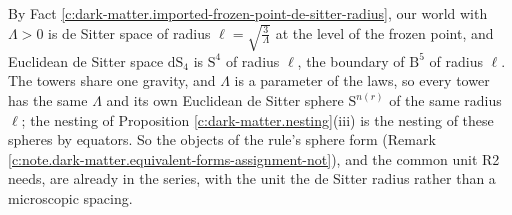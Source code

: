 \documentclass[11pt]{article}
\theoremstyle{definition}
\theoremstyle{plain}
\providecommand{\B}{}\renewcommand{\B}{\mathrm{B}}
\providecommand{\Sph}{}\renewcommand{\Sph}{\mathrm{S}}
\providecommand{\dS}{}\renewcommand{\dS}{\mathrm{dS}}
\begin{document}
\label{c:note.dark-matter.setting-what-could-fix-unit-de-2}
By Fact \ref{c:dark-matter.imported-frozen-point-de-sitter-radius}, our world with $\Lambda > 0$ is de Sitter space of radius $\ell = \sqrt{\tfrac{3}{\Lambda}}$ at the level of the frozen point, and Euclidean de Sitter space $\dS_{4}$ is $\Sph^{4}$ of radius $\ell$, the boundary of $\B^{5}$ of radius $\ell$. The towers share one gravity, and $\Lambda$ is a parameter of the laws, so every tower has the same $\Lambda$ and its own Euclidean de Sitter sphere $\Sph^{n(r)}$ of the same radius $\ell$; the nesting of Proposition \ref{c:dark-matter.nesting}(iii) is the nesting of these spheres by equators. So the objects of the rule's sphere form (Remark \ref{c:note.dark-matter.equivalent-forms-assignment-not}), and the common unit R2 needs, are already in the series, with the unit the de Sitter radius rather than a microscopic spacing.
\end{document}

